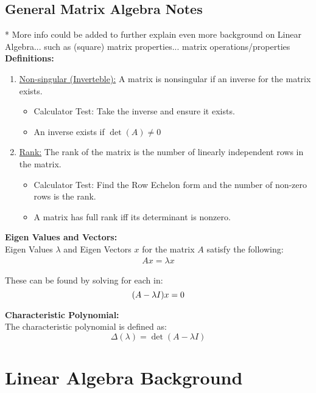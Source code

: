 \documentclass[]{article}
\begin{document}
\subsection*{General Matrix Algebra Notes}
* More info could be added to further explain even more background on Linear Algebra... such as (square) matrix properties... matrix operations/properties\\

\textbf{Definitions:}
\begin{enumerate}
	\item \underline{Non-singular (Inverteble):} A matrix is nonsingular if an inverse for the matrix exists.
		\begin{itemize}
			\item Calculator Test: Take the inverse and ensure it exists.
			\item An inverse exists if $\det(A) \neq 0$
		\end{itemize}
	\item \underline{Rank:} The rank of the matrix is the number of linearly independent rows in the matrix.
		\begin{itemize}
			\item Calculator Test: Find the Row Echelon form and the number of non-zero rows is the rank.
			\item A matrix has full rank iff its determinant is nonzero.
		\end{itemize}
\end{enumerate}


\textbf{Eigen Values and Vectors:}\\
Eigen Values $\lambda$ and Eigen Vectors $x$ for the matrix $A$ satisfy the following:
\begin{align*}
	A x = \lambda x
\end{align*}

These can be found by solving for each in:
\begin{displaymath}
	\qty(A-\lambda I)x = 0
\end{displaymath}

\textbf{Characteristic Polynomial:}\\
The characteristic polynomial is defined as:
\begin{displaymath}
	\Delta(\lambda) = \det(A - \lambda I)
\end{displaymath}



\section*{Linear Algebra Background}
\end{document}
